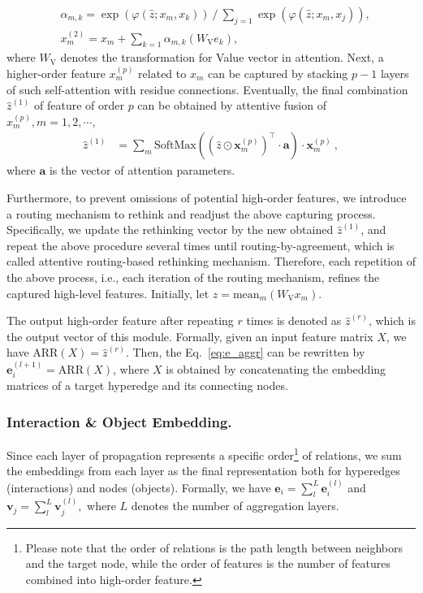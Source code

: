 \documentclass[11pt]{article}
\begin{document}
\begin{align}
	& \alpha_{m, k} = {\exp \left(\varphi(\hat{z}; x_m, x_k)\right)} \ /\  {\sum\nolimits_{j=1} \exp \left(\varphi(\hat{z}; x_m, x_j)\right)}, \label{eq:alpha} \\
	& x_m^{(2)} = x_m + \sum\nolimits_{k=1} \alpha_{m, k}(W_{\text{V}} e_{k}) ,  \label{eq:highorder}
\end{align}
where $ W_{\text{V}} $ denotes the transformation for Value vector in attention. Next, a higher-order feature $ x_m^{(p)} $ related to $ x_m $ can be captured by stacking $ p-1 $ layers of such self-attention with residue connections. Eventually, the final combination $ \hat{z}^{(1)} $ of feature of order $ p $ can be obtained by attentive fusion of $x_m^{(p)}, m=1,2,\cdots$,
\begin{align}
	\hat{z}^{(1)} &= \sum\nolimits_m \text{SoftMax} \left( (\hat{z} \odot \boldsymbol x_m^{(p)})^\top \cdot \boldsymbol a \right) \cdot \boldsymbol x_m^{(p)} \ ,   \label{eq:update}
\end{align}
where $ \boldsymbol a $ is the vector of attention parameters.


Furthermore, to prevent omissions of potential high-order features, we introduce a routing mechanism to rethink and readjust the above capturing process. Specifically, we update the rethinking vector by the new obtained $ \hat{z}^{(1)} $, and repeat the above procedure  several times until routing-by-agreement, which is called attentive routing-based rethinking mechanism. Therefore, each repetition of the above process, i.e., each iteration of the routing mechanism, refines the captured high-level features. Initially, let $\hat{z} = \text{mean}_m (W_{\text{V}} x_m)$.

The output high-order feature after repeating $r$ times is denoted as $ \hat{z}^{(r)} $, which is the output vector of this module. Formally, given an input feature matrix $X$, we have $ \text{ARR}(X) = \hat{z}^{(r)} $.
Then, the Eq.~\eqref{eq:e_aggr} can be rewritten by $ \boldsymbol e^{(l+1)}_i = \text{ARR}(X) $, where $ X $ is obtained by concatenating the embedding matrices of a target hyperedge and its connecting nodes.


\subsubsection{Interaction \& Object Embedding. }
Since each layer of propagation represents a specific order\footnote{Please note that the order of relations is the path length between neighbors and the target node, while the order of features is the number of features combined into high-order feature.} of relations, we sum the embeddings from each layer as the final representation both for hyperedges (interactions) and nodes (objects). Formally, we have
$
\boldsymbol e_i = \sum\nolimits_l^L \boldsymbol e^{(l)}_i $ and $ \boldsymbol v_j = \sum\nolimits_l^L \boldsymbol v^{(l)}_j ,
$
where $L$ denotes the number of aggregation layers.
\end{document}
